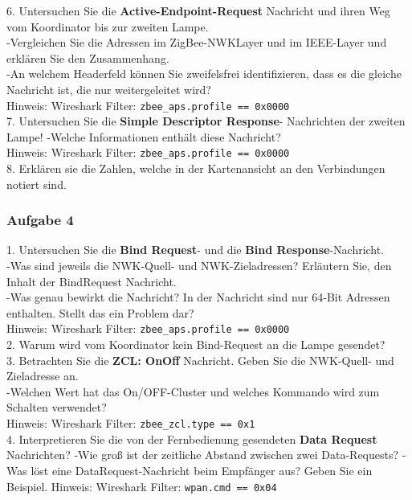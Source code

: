\begin{Fragen}
    6. Untersuchen Sie die \textbf{Active-Endpoint-Request} Nachricht und ihren Weg vom Koordinator bis zur zweiten Lampe.\\
    -Vergleichen Sie die Adressen im ZigBee-NWKLayer und im IEEE-Layer und erklären Sie den Zusammenhang.\\
    -An welchem Headerfeld können Sie zweifelsfrei identifizieren, dass es die gleiche Nachricht ist, die nur weitergeleitet wird? \\
    Hinweis: Wireshark Filter: \verb|zbee_aps.profile == 0x0000|\\
    
    7. Untersuchen Sie die \textbf{Simple Descriptor Response}- Nachrichten der zweiten Lampe!
    -Welche Informationen enthält diese Nachricht? \\
    Hinweis: Wireshark Filter: \verb|zbee_aps.profile == 0x0000|\\

    8. Erklären sie die Zahlen, welche in der Kartenansicht an den Verbindungen notiert sind.\\
\end{Fragen}
\subsubsection{Aufgabe 4}
\begin{Fragen}
    1. Untersuchen Sie die \textbf{Bind Request}- und die \textbf{Bind Response}-Nachricht.\\
    -Was sind jeweils die NWK-Quell- und NWK-Zieladressen? Erläutern Sie, den Inhalt der BindRequest Nachricht.\\
    -Was genau bewirkt die Nachricht? In der Nachricht sind nur 64-Bit Adressen enthalten. Stellt das ein Problem dar? \\
    Hinweis: Wireshark Filter: \verb|zbee_aps.profile == 0x0000|\\
    
    2. Warum wird vom Koordinator kein Bind-Request an die Lampe gesendet? \\
    
    3. Betrachten Sie die \textbf{ZCL: OnOff} Nachricht. Geben Sie die NWK-Quell- und Zieladresse an.\\
    -Welchen Wert hat das On/OFF-Cluster und welches Kommando wird zum Schalten verwendet?\\
    Hinweis: Wireshark Filter: \verb|zbee_zcl.type == 0x1|\\
    
    4. Interpretieren Sie die von der Fernbedienung gesendeten \textbf{Data Request} Nachrichten?
    -Wie groß ist der zeitliche Abstand zwischen zwei Data-Requests? 
    -Was löst eine DataRequest-Nachricht beim Empfänger aus? Geben Sie ein Beispiel. 
    Hinweis: Wireshark Filter: \verb|wpan.cmd == 0x04|\\
\end{Fragen}
